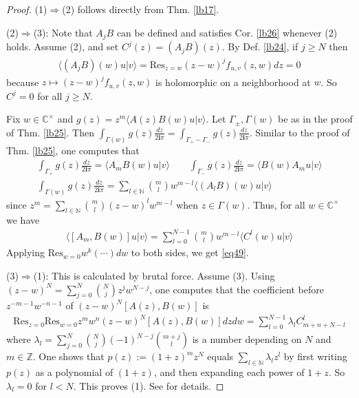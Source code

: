 \documentclass[12pt,b5paper,notitlepage]{article}
\theoremstyle{definition}
\theoremstyle{plain}
\newcommand{\Res}{\mathrm{Res}}
\newcommand{\bk}[1]{\langle {#1}\rangle}
\newcommand{\im}{\mathbf{i}}
\newcommand{\Cbb}{\mathbb C}
\newcommand{\Nbb}{\mathbb N}
\newcommand{\Zbb}{\mathbb Z}
\numberwithin{equation}{section}
\begin{document}
\begin{proof}
(1)$\Rightarrow$(2) follows directly from Thm. \ref{lb17}.

(2)$\Rightarrow$(3):  Note that $A_jB$ can be defined and satisfies Cor. \ref{lb26} whenever (2) holds. Assume (2), and set $C^j(z)=(A_jB)(z)$. By Def. \ref{lb24}, if $j\geq N$ then 
\begin{align*}
\bk{(A_jB)(w)u|v}=\Res_{z=w}(z-w)^jf_{u,v}(z,w)dz=0
\end{align*}
because $z\mapsto (z-w)^jf_{u,v}(z,w)$ is holomorphic on a neighborhood at $w$. So $C^j=0$ for all $j\geq N$.

Fix $w\in\Cbb^\times$ and $g(z)=z^m\bk{A(z)B(w)u|v}$. Let $\Gamma_\pm,\Gamma(w)$ be as in the proof of Thm. \ref{lb25}. Then $\int_{\Gamma(w)}g(z)\frac{dz}{2\im\pi}=\int_{\Gamma_+-\Gamma_-}g(z)\frac{dz}{2\im\pi}$. Similar to the proof of Thm. \ref{lb25}, one computes that
\begin{gather*}
\int_{\Gamma_+}g(z)\frac{dz}{2\im\pi}=\bk{A_m B(w)u|v}\qquad \int_{\Gamma_-}g(z)\frac{dz}{2\im\pi}=\bk{B(w)A_mu|v}\\
\int_{\Gamma(w)}g(z)\frac{dz}{2\im\pi}=\sum_{l\in\Nbb}{m\choose l}w^{m-l}\bk{(A_lB)(w)u|v}
\end{gather*}
since $z^m=\sum_{l\in\Nbb}{m\choose l}(z-w)^lw^{m-l}$ when $z\in\Gamma(w)$. Thus, for all $w\in\Cbb^\times$ we have
\begin{align*}
\bk{[A_m,B(w)]u|v}=\sum_{l=0}^{N-1}{m\choose l}w^{m-l}\bk{C^l(w)u|v}
\end{align*}
Applying $\Res_{w=0} w^k(\cdots)dw$ to both sides, we get \eqref{eq49}.

(3)$\Rightarrow$(1): This is calculated by brutal force. Assume (3). Using $(z-w)^N=\sum_{j=0}^N{N\choose j}z^jw^{N-j}$, one computes that the coefficient before $z^{-m-1}w^{-n-1}$ of $(z-w)^N[A(z),B(w)]$ is
\begin{align*}
\Res_{z=0}\Res_{w=0}z^mw^n(z-w)^N[A(z),B(w)]dzdw=\sum_{l=0}^{N-1}\lambda_l C^l_{m+n+N-l}
\end{align*}
where $\lambda_l=\sum_{j=0}^N{N\choose j}(-1)^{N-j}{m+j\choose l}$ is a number depending on $N$ and $m\in\Zbb$. One shows that $p(z):=(1+z)^mz^N$ equals $\sum_{l\in\Nbb}\lambda_l z^l$ by first writing $p(z)$ as a polynomial of $(1+z)$, and then expanding each power of $1+z$. So $\lambda_l=0$ for $l< N$. This proves (1). See \cite[Subset. 7.8]{Gui-V} for details.
\end{proof}


\subsection{}
\end{document}
